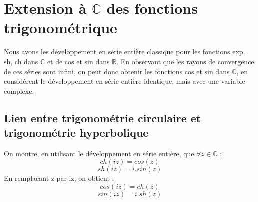 \section{Extension à $\mathbb{C}$ des fonctions trigonométrique}
Nous avons les développement en série entière classique pour les fonctions exp, sh, ch dans $\mathbb{C}$ et de cos et sin dans $\mathbb{R}$. En observant que les rayons de convergence de ces séries sont infini, on peut donc obtenir les fonctions cos et sin dans $\mathbb{C}$, en considérent le développement en série entière identique, mais avec une variable complexe.
\subsection{Lien entre trigonométrie circulaire et trigonométrie hyperbolique}
On montre, en utilisant le développement en série entière, que $\forall z \in \mathbb{C}$ : 
$$ch(iz) = cos(z) $$
$$sh(iz) = i.sin(z)$$
En remplacant z par iz, on obtient : 
$$cos(iz) = ch(z)$$
$$sin(iz) = i.sh(z)$$
